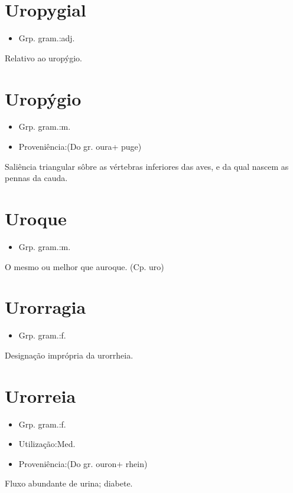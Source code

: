 \documentclass{article}
\begin{document}
\section{Uropygial}
\begin{itemize}
\item {Grp. gram.:adj.}
\end{itemize}
Relativo ao uropýgio.
\section{Uropýgio}
\begin{itemize}
\item {Grp. gram.:m.}
\end{itemize}
\begin{itemize}
\item {Proveniência:(Do gr. \textunderscore oura\textunderscore  + \textunderscore puge\textunderscore )}
\end{itemize}
Saliência triangular sôbre as vértebras inferiores das aves, e da qual nascem as pennas da cauda.
\section{Uroque}
\begin{itemize}
\item {Grp. gram.:m.}
\end{itemize}
O mesmo ou melhor que \textunderscore auroque\textunderscore .
(Cp. \textunderscore uro\textunderscore )
\section{Urorragia}
\begin{itemize}
\item {Grp. gram.:f.}
\end{itemize}
Designação imprópria da urorrheia.
\section{Urorreia}
\begin{itemize}
\item {Grp. gram.:f.}
\end{itemize}
\begin{itemize}
\item {Utilização:Med.}
\end{itemize}
\begin{itemize}
\item {Proveniência:(Do gr. \textunderscore ouron\textunderscore  + \textunderscore rhein\textunderscore )}
\end{itemize}
Fluxo abundante de urina; diabete.
\end{document}
